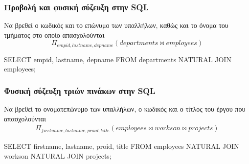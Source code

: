 \begin{frame}
\frametitle{Προβολή και φυσική σύζευξη στην {\en SQL}}
\begin{minipage}{\wE}
\begin{exampleblock}{\small Να βρεθεί ο κωδικός και το επώνυμο των υπαλλήλων, καθώς και το όνομα
              του τμήματος στο οποίο απασχολούνται}
\pause              
  \[ \Pi_{empid, lastname, depname} (departments \bowtie employees) \]
\pause
\en
\begin{SQL}
  SELECT empid, lastname, depname
    FROM departments NATURAL JOIN employees;
\end{SQL}
\end{exampleblock}
\end{minipage}
\end{frame}


\begin{frame}
\frametitle{Φυσική σύζευξη τριών πινάκων στην {\en SQL}}
\begin{minipage}{\wE}
\begin{exampleblock}{\small Να βρεθεί το ονοματεπώνυμο των υπαλλήλων, 
ο κωδικός και ο τίτλος του έργου που απασχολούνται}
\pause
\[
\begin{split}
  \Pi_{firstname, lastname, proid, title}     
       ( employees \bowtie workson \bowtie projects )
\end{split}
\]
\pause
\en
\begin{SQL}
  SELECT firstname, lastname, proid, title
    FROM employees NATURAL JOIN workson
                   NATURAL JOIN projects;
\end{SQL}
\end{exampleblock}
\end{minipage}
\end{frame}



